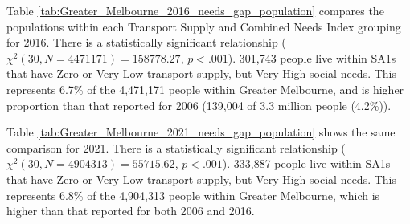 \documentclass[preprint, 3p,
authoryear]{elsarticle} %
\begin{document}
Table \ref{tab:Greater_Melbourne_2016_needs_gap_population} compares the
populations within each Transport Supply and Combined Needs Index
grouping for 2016. There is a statistically significant relationship
(\(\chi^2(30, N = 4471171) = 158778.27\), \(p < .001\)). 301,743 people
live within SA1s that have Zero or Very Low transport supply, but Very
High social needs. This represents 6.7\% of the 4,471,171 people within
Greater Melbourne, and is higher proportion than that reported for 2006
(139,004 of 3.3 million people (4.2\%)).

Table \ref{tab:Greater_Melbourne_2021_needs_gap_population} shows the
same comparison for 2021. There is a statistically significant
relationship (\(\chi^2(30, N = 4904313) = 55715.62\), \(p < .001\)).
333,887 people live within SA1s that have Zero or Very Low transport
supply, but Very High social needs. This represents 6.8\% of the
4,904,313 people within Greater Melbourne, which is higher than that
reported for both 2006 and 2016.

\begingroup\fontsize{8}{10}\selectfont
\end{document}
